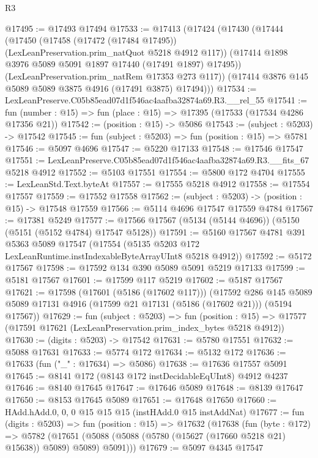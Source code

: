 \begin{lexlean}{R3}
\begin{coremodule}
@17495 := @17493 @17494
@17533 := @17413
    (@17424
      (@17430
        (@17444
          (@17450
            (@17458 (@17472 (@17484 @17495)) (LexLeanPreservation.prim_natQuot @5218 @4912 @117))
            (@17414 @1898 @3976 @5089 @5091 @1897 @17440 (@17491 @1897) @17495))
          (LexLeanPreservation.prim_natRem @17353 @273 @117))
        (@17414 @3876 @145 @5089 @5089 @3875 @4916 (@17491 @3875) @17494)))
@17534 := LexLeanPreserve.C05b85ead07d1f546ac4aafba32874a69.R3.__rel_55
@17541 := fun (number : @15) => fun (place : @15) => @17395 (@17533 (@17534 @4286 @17356 @21))
@17542 := (position : @15) -> @5086
@17543 := (subject : @5203) -> @17542
@17545 := fun (subject : @5203) => fun (position : @15) => @5781
@17546 := @5097 @4696
@17547 := @5220 @17133
@17548 := @17546 @17547
@17551 := LexLeanPreserve.C05b85ead07d1f546ac4aafba32874a69.R3.__fits_67 @5218 @4912
@17552 := @5103 @17551
@17554 := @5800 @172 @4704
@17555 := LexLeanStd.Text.byteAt
@17557 := @17555 @5218 @4912
@17558 := @17554 @17557
@17559 := @17552 @17558
@17562 := (subject : @5203) -> (position : @15) -> @17548 @17559
@17566 := @5114 @4696 @17547 @17559 @4784
@17567 := @17381 @5249
@17577 := @17566 @17567 (@5134 (@5144 @4696)) (@5150 (@5151 (@5152 @4784) @17547 @5128))
@17591 := @5160
    @17567
    @4781
    @391
    @5363
    @5089
    @17547
    (@17554 (@5135 @5203 @172 LexLeanRuntime.instIndexableByteArrayUInt8 @5218 @4912))
@17592 := @5172 @17567
@17598 := @17592 @134 @390 @5089 @5091 @5219 @17133
@17599 := @5181 @17567
@17601 := @17599 @117 @5219
@17602 := @5187 @17567
@17621 := @17598
    (@17601 (@5186 (@17602 @117)))
    (@17592
      @286
      @145
      @5089
      @5089
      @17131
      @4916
      (@17599 @21 @17131 (@5186 (@17602 @21)))
      (@5194 @17567))
@17629 := fun (subject : @5203) =>
  fun (position : @15) => @17577 (@17591 @17621 (LexLeanPreservation.prim_index_bytes @5218 @4912))
@17630 := (digits : @5203) -> @17542
@17631 := @5780 @17551
@17632 := @5088 @17631
@17633 := @5774 @172
@17634 := @5132 @172
@17636 := @17633 (fun ("_" : @17634) => @5086)
@17638 := @17636 @17557 @5091
@17645 := @8141 @172 (@8143 @172 instDecidableEqUInt8) @4912 @4237
@17646 := @8140 @17645
@17647 := @17646 @5089
@17648 := @8139 @17647
@17650 := @8153 @17645 @5089
@17651 := @17648 @17650
@17660 := HAdd.hAdd.{0, 0, 0} @15 @15 @15 (instHAdd.{0} @15 instAddNat)
@17677 := fun (digits : @5203) =>
  fun (position : @15) =>
  @17632
    (@17638
      (fun (byte : @172) =>
      @5782 (@17651 (@5088 (@5088 (@5780 (@15627 (@17660 @5218 @21) @15638)) @5089) @5089) @5091)))
@17679 := @5097 @4345 @17547

\end{coremodule}
\end{lexlean}
